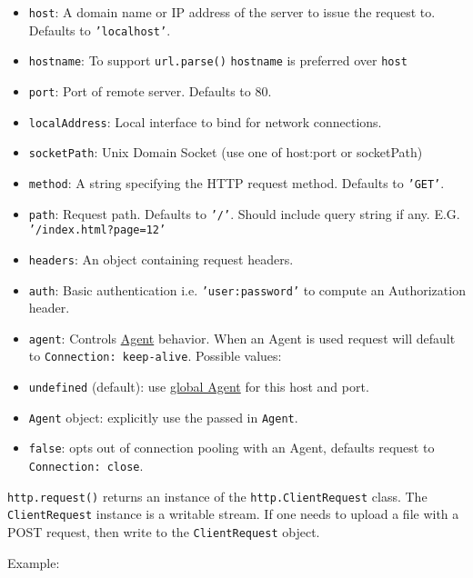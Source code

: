 \begin{itemize}
\item
  \texttt{host}: A domain name or IP address of the server to issue the
  request to. Defaults to \texttt{'localhost'}.
\item
  \texttt{hostname}: To support \texttt{url.parse()} \texttt{hostname}
  is preferred over \texttt{host}
\item
  \texttt{port}: Port of remote server. Defaults to 80.
\item
  \texttt{localAddress}: Local interface to bind for network
  connections.
\item
  \texttt{socketPath}: Unix Domain Socket (use one of host:port or
  socketPath)
\item
  \texttt{method}: A string specifying the HTTP request method. Defaults
  to \texttt{'GET'}.
\item
  \texttt{path}: Request path. Defaults to \texttt{'/'}. Should include
  query string if any. E.G. \texttt{'/index.html?page=12'}
\item
  \texttt{headers}: An object containing request headers.
\item
  \texttt{auth}: Basic authentication i.e. \texttt{'user:password'} to
  compute an Authorization header.
\item
  \texttt{agent}: Controls \hyperref[http\_class\_http\_agent]{Agent}
  behavior. When an Agent is used request will default to
  \texttt{Connection: keep-alive}. Possible values:
\item
  \texttt{undefined} (default): use
  \hyperref[http\_http\_globalagent]{global Agent} for this host and
  port.
\item
  \texttt{Agent} object: explicitly use the passed in \texttt{Agent}.
\item
  \texttt{false}: opts out of connection pooling with an Agent, defaults
  request to \texttt{Connection: close}.
\end{itemize}

\texttt{http.request()} returns an instance of the
\texttt{http.ClientRequest} class. The \texttt{ClientRequest} instance
is a writable stream. If one needs to upload a file with a POST request,
then write to the \texttt{ClientRequest} object.

Example:

